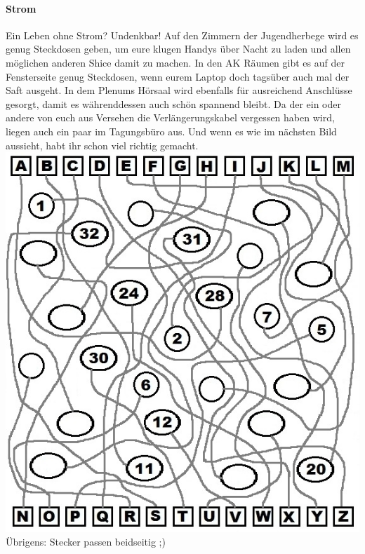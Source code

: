   \paragraph{Strom}
  Ein Leben ohne Strom? Undenkbar!
  Auf den Zimmern der Jugendherbege wird es genug Steckdosen geben, um eure klugen Handys über Nacht zu laden
  und allen möglichen anderen Shice damit zu machen. In den AK Räumen gibt es auf der Fensterseite
  genug Steckdosen, wenn eurem Laptop doch tagsüber auch mal der Saft ausgeht. In dem Plenums Hörsaal
  wird ebenfalls für ausreichend Anschlüsse gesorgt, damit es währenddessen auch schön spannend bleibt.
  Da der ein oder andere von euch aus Versehen die Verlängerungskabel vergessen haben wird,
  liegen auch ein paar im Tagungsbüro aus. Und wenn es wie im nächsten Bild aussieht,
  habt ihr schon viel richtig gemacht.
  \includegraphics{kabel_raetsel}
  Übrigens: Stecker passen beidseitig ;)

